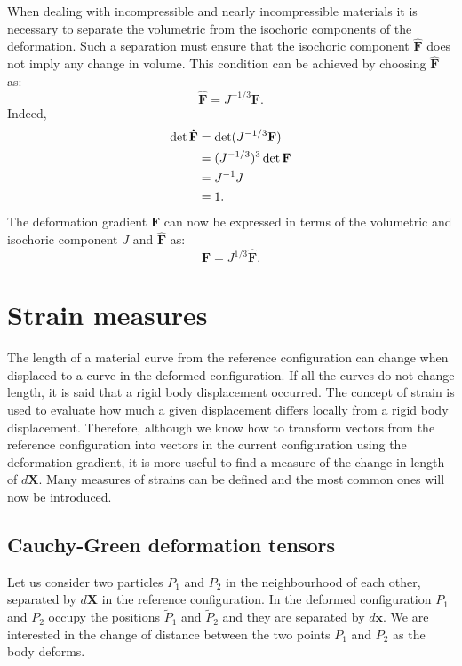 When dealing with incompressible and nearly incompressible materials it is necessary to separate the volumetric from the isochoric components of the deformation. Such a separation must ensure that the isochoric component $\mathbf{\hat{F}}$ does not imply any change in volume. This condition can be achieved by choosing $\mathbf{\hat{F}}$ as:
\begin{equation}
\mathbf{\hat{F}} = J^{-1/3} \mathbf{F}.
\end{equation}
Indeed,
\begin{align}
\det \mathbf{\hat{F}} &= \det (J^{-1/3} \mathbf{F}) \notag \\
&= (J^{-1/3})^3 \det \mathbf{F} \notag \\
&= J^{-1} J \notag \\
&= 1.
\end{align}
The deformation gradient $\mathbf{F}$ can now be expressed in terms of the volumetric and isochoric component $J$ and $\mathbf{\hat{F}}$ as:
\begin{equation}
\mathbf{F} = J^{1/3} \mathbf{\hat{F}}.
\end{equation}
			
			
\section{Strain measures}	\label{chap2:strainMeasures}
The length of a material curve from the reference configuration can change when displaced to a curve in the deformed configuration. If all the curves do not change length, it is said that a rigid body displacement occurred. The concept of strain is used to evaluate how much a given displacement differs locally from a rigid body displacement. Therefore, although we know how to transform vectors from the reference configuration into vectors in the current configuration using the deformation gradient, it is more useful to find a measure of the change in length of $d\mathbf{X}$. Many measures of strains can be defined and the most common ones will now be introduced. 

	\subsection{Cauchy-Green deformation tensors}
Let us consider two particles $P_{1}$ and $P_{2}$ in the neighbourhood of each other, separated by $d\mathbf{X}$ in the reference configuration. In the deformed configuration $P_{1}$ and $P_{2}$ occupy the positions $\tilde{P}_{1}$ and $\tilde{P}_{2}$ and they are separated by $d\mathbf{x}$. We are interested in the change of distance between the two points $P_{1}$ and $P_{2}$ as the body deforms. 

